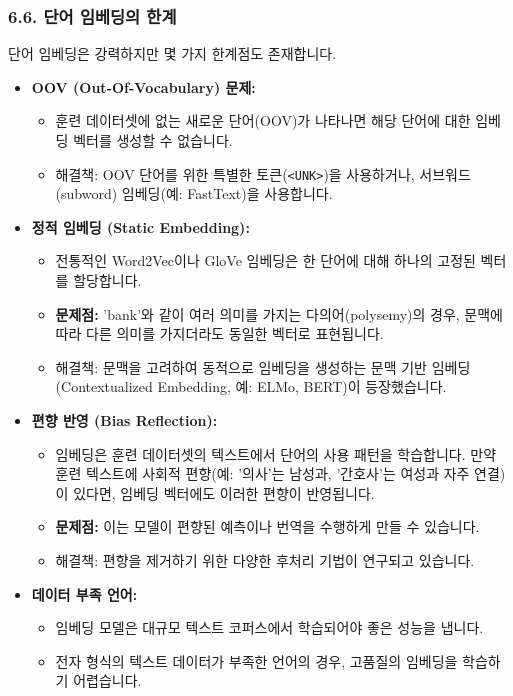 \documentclass[11pt,a4paper]{article}
\begin{document}
\subsubsection*{6.6. 단어 임베딩의 한계}
단어 임베딩은 강력하지만 몇 가지 한계점도 존재합니다.

\begin{itemize}
    \item \textbf{OOV (Out-Of-Vocabulary) 문제:}
    \begin{itemize}
        \item 훈련 데이터셋에 없는 새로운 단어(OOV)가 나타나면 해당 단어에 대한 임베딩 벡터를 생성할 수 없습니다.
        \item 해결책: OOV 단어를 위한 특별한 토큰(\texttt{<UNK>})을 사용하거나, 서브워드(subword) 임베딩(예: FastText)을 사용합니다.
    \end{itemize}
    \item \textbf{정적 임베딩 (Static Embedding):}
    \begin{itemize}
        \item 전통적인 Word2Vec이나 GloVe 임베딩은 한 단어에 대해 하나의 고정된 벡터를 할당합니다.
        \item \textbf{문제점:} 'bank'와 같이 여러 의미를 가지는 다의어(polysemy)의 경우, 문맥에 따라 다른 의미를 가지더라도 동일한 벡터로 표현됩니다.
        \item 해결책: 문맥을 고려하여 동적으로 임베딩을 생성하는 문맥 기반 임베딩(Contextualized Embedding, 예: ELMo, BERT)이 등장했습니다.
    \end{itemize}
    \item \textbf{편향 반영 (Bias Reflection):}
    \begin{itemize}
        \item 임베딩은 훈련 데이터셋의 텍스트에서 단어의 사용 패턴을 학습합니다. 만약 훈련 텍스트에 사회적 편향(예: '의사'는 남성과, '간호사'는 여성과 자주 연결)이 있다면, 임베딩 벡터에도 이러한 편향이 반영됩니다.
        \item \textbf{문제점:} 이는 모델이 편향된 예측이나 번역을 수행하게 만들 수 있습니다.
        \item 해결책: 편향을 제거하기 위한 다양한 후처리 기법이 연구되고 있습니다.
    \end{itemize}
    \item \textbf{데이터 부족 언어:}
    \begin{itemize}
        \item 임베딩 모델은 대규모 텍스트 코퍼스에서 학습되어야 좋은 성능을 냅니다.
        \item 전자 형식의 텍스트 데이터가 부족한 언어의 경우, 고품질의 임베딩을 학습하기 어렵습니다.
    \end{itemize}
\end{itemize}
\end{document}
